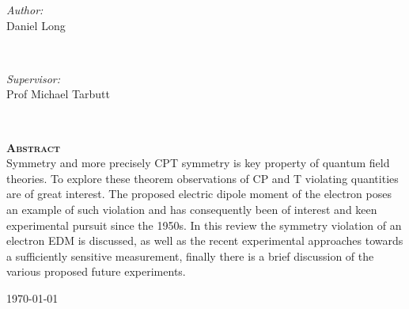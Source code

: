 \begin{titlepage}
\begin{minipage}{0.4\textwidth}
\begin{flushleft} \large
\emph{Author:}\\
Daniel Long
\end{flushleft}
\end{minipage}
~
\begin{minipage}{0.4\textwidth}
\begin{flushright} \large
\emph{Supervisor:} \\
Prof Michael Tarbutt
\end{flushright}
\end{minipage}\\[3cm]
\makeatother


\textsc{\bf{\large Abstract}}\\[0.5cm] %

Symmetry and more precisely CPT symmetry is key property of quantum field theories. To explore these theorem observations of CP and T violating quantities are of great interest. The proposed electric dipole moment of the electron poses an example of such violation and has consequently been of interest and keen experimental pursuit since the 1950s. In this review the symmetry violation of an electron EDM is discussed, as well as the recent experimental approaches towards a sufficiently sensitive measurement, finally there is a brief discussion of the various proposed future experiments.

\vspace*{\fill}

{\large \today}\\[2cm] %

\end{titlepage}